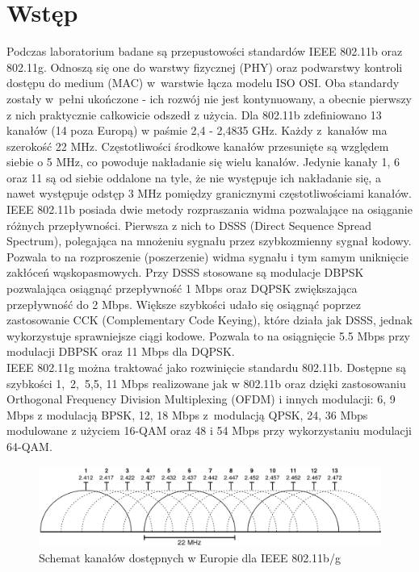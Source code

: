 \documentclass[12pt, a4paper, oneside]{article}
\begin{document}
\section{Wstęp}
\indent\indent Podczas laboratorium badane są przepustowości standardów IEEE 802.11b oraz 802.11g. Odnoszą się one do warstwy fizycznej (PHY) oraz podwarstwy kontroli dostępu do medium (MAC) w~warstwie łącza modelu ISO OSI. Oba standardy zostały w~pełni ukończone - ich rozwój nie jest kontynuowany, a obecnie pierwszy z nich praktycznie całkowicie odszedł z użycia. Dla 802.11b zdefiniowano 13 kanałów (14 poza Europą) w paśmie 2,4 - 2,4835 GHz. Każdy z~kanałów ma szerokość 22 MHz. Częstotliwości środkowe kanałów przesunięte są względem siebie o 5 MHz, co powoduje nakładanie się wielu kanałów. Jedynie kanały 1, 6 oraz 11 są od siebie oddalone na tyle, że nie występuje ich nakładanie się, a nawet występuje odstęp 3 MHz pomiędzy granicznymi częstotliwościami kanałów.\\
\indent IEEE 802.11b posiada dwie metody rozpraszania widma pozwalające na osiąganie różnych przepływności. Pierwsza z nich to DSSS (Direct Sequence Spread Spectrum), polegająca na mnożeniu sygnału przez szybkozmienny sygnał kodowy. Pozwala to na rozproszenie (poszerzenie) widma sygnału i tym samym uniknięcie zakłóceń wąskopasmowych. Przy DSSS stosowane są modulacje DBPSK pozwalająca osiągnąć przepływność 1 Mbps oraz DQPSK zwiększająca przepływność do 2 Mbps. Większe szybkości udało się osiągnąć poprzez zastosowanie CCK (Complementary Code Keying), które działa jak DSSS, jednak wykorzystuje sprawniejsze ciągi kodowe. Pozwala to na osiągnięcie 5.5 Mbps przy modulacji DBPSK oraz 11 Mbps dla DQPSK.\\
\indent IEEE 802.11g można traktować jako rozwinięcie standardu 802.11b. Dostępne są szybkości 1,~2,~5,5, 11 Mbps realizowane jak w 802.11b oraz dzięki zastosowaniu Orthogonal Frequency Division Multiplexing (OFDM) i innych modulacji: 6, 9 Mbps z modulacją BPSK, 12, 18 Mbps z~modulacją QPSK, 24, 36 Mbps modulowane z użyciem 16-QAM oraz 48 i 54 Mbps przy wykorzystaniu modulacji 64-QAM.
\begin{figure}[h!]
\centering
\includegraphics[scale=0.45]{pics/f2.png}
\caption{Schemat kanałów dostępnych w Europie dla IEEE 802.11b/g}
\end{figure}\\
\end{document}
